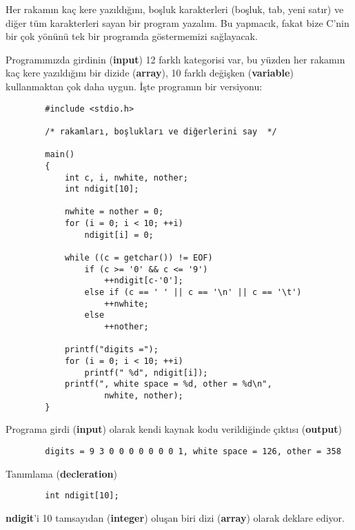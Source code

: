 \documentclass[a4paper,12pt,oneside]{book}
\begin{document}
Her rakamın kaç kere yazıldığını, boşluk karakterleri (boşluk, tab, yeni satır) ve diğer tüm karakterleri sayan bir program yazalım. Bu yapmacık, fakat bize C'nin bir çok yönünü tek bir programda göstermemizi sağlayacak.
\par Programımızda girdinin (\textbf{input}) 12 farklı kategorisi var, bu yüzden her rakamın kaç kere yazıldığını bir dizide (\textbf{array}), 10 farklı değişken (\textbf{variable}) kullanmaktan çok daha uygun. İşte programın bir versiyonu:
\begin{lstlisting}
		#include <stdio.h>

		/* rakamları, boşlukları ve diğerlerini say  */

		main()
		{
			int c, i, nwhite, nother;
			int ndigit[10];

			nwhite = nother = 0;
			for (i = 0; i < 10; ++i)
				ndigit[i] = 0;

			while ((c = getchar()) != EOF)
				if (c >= '0' && c <= '9')
					++ndigit[c-'0'];
				else if (c == ' ' || c == '\n' || c == '\t')
					++nwhite;
				else
					++nother;

			printf("digits =");
			for (i = 0; i < 10; ++i)
				printf(" %d", ndigit[i]);
			printf(", white space = %d, other = %d\n",
					nwhite, nother);
		}
\end{lstlisting}
Programa girdi (\textbf{input}) olarak kendi kaynak kodu verildiğinde çıktısı (\textbf{output})
\begin{lstlisting}
		digits = 9 3 0 0 0 0 0 0 0 1, white space = 126, other = 358
\end{lstlisting}
Tanımlama (\textbf{decleration})
\begin{lstlisting}
		int ndigit[10];
\end{lstlisting}
\textbf{ndigit}'i 10 tamsayıdan (\textbf{integer}) oluşan biri dizi (\textbf{array}) olarak deklare ediyor. \pagebreak
\end{document}
